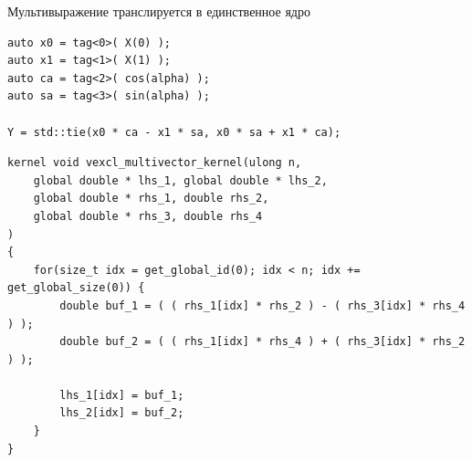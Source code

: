 \documentclass[@BEAMER_OPTIONS@]{beamer}
\begin{document}
\begin{frame}[fragile,shrink=5]{Мультивыражение транслируется в единственное
    ядро}
    \begin{exampleblock}{}
        \begin{lstlisting}
auto x0 = tag<0>( X(0) );
auto x1 = tag<1>( X(1) );
auto ca = tag<2>( cos(alpha) );
auto sa = tag<3>( sin(alpha) );

Y = std::tie(x0 * ca - x1 * sa, x0 * sa + x1 * ca);
        \end{lstlisting}
    \end{exampleblock}
    \begin{exampleblock}{}
        \begin{lstlisting}
kernel void vexcl_multivector_kernel(ulong n,
    global double * lhs_1, global double * lhs_2,
    global double * rhs_1, double rhs_2,
    global double * rhs_3, double rhs_4
)
{
    for(size_t idx = get_global_id(0); idx < n; idx += get_global_size(0)) {
        double buf_1 = ( ( rhs_1[idx] * rhs_2 ) - ( rhs_3[idx] * rhs_4 ) );
        double buf_2 = ( ( rhs_1[idx] * rhs_4 ) + ( rhs_3[idx] * rhs_2 ) );

        lhs_1[idx] = buf_1;
        lhs_2[idx] = buf_2;
    }
}

        \end{lstlisting}
    \end{exampleblock}
\end{frame}
\end{document}

